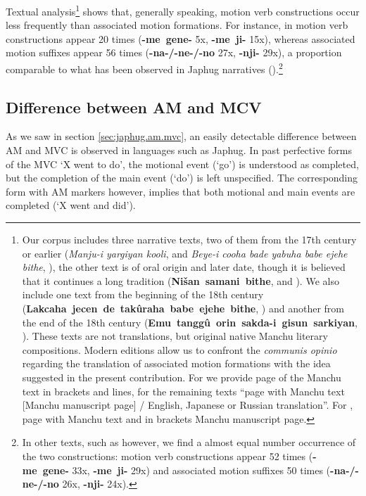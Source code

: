 \documentclass{article}
\newcommand{\ipa}[1]{\textbf{{\phon\mbox{#1}}}} %
\begin{document}
Textual analysis\footnote{Our corpus includes three narrative texts, two of them from the 17th century or earlier (\textit{Manju-i yargiyan kooli}, \citealt{shunjuu92yargiyan} and \textit{Beye-i cooha bade yabuha babe ejehe bithe}, \citealt{cosmo06dzengseo}), the other text is of oral origin and later date, though it is believed that it continues a long tradition (\ipa{Nišan samani bithe}, \citealt{nowak77nisan} and \citealt{jaxontov93nisan}). We also include one text from the beginning of the 18th century (\ipa{Lakcaha jecen de takûraha babe ejehe bithe}, \citealt{shunjuu64tulishen}) and another from the end of the 18th century  (\ipa{Emu tanggû orin sakda-i gisun sarkiyan}, \citealt{stary83sakda}). These texts are not translations, but original native Manchu literary compositions. Modern editions allow us to confront the \textit{communis opinio} regarding the translation of associated motion formations with the idea suggested in the present contribution. For \citet{shunjuu92yargiyan} we provide page of the Manchu text in brackets and lines, for the remaining texts “page with Manchu text [Manchu manuscript page] / English, Japanese or Russian translation”. For \citet{stary83sakda}, page with Manchu text and in brackets Manchu manuscript page.} shows that, generally speaking, motion verb constructions occur less frequently than associated motion formations. For instance, in \citet{cosmo06dzengseo} motion verb constructions appear 20 times (\ipa{-me gene-} 5x, \ipa{-me ji-} 15x), whereas associated motion suffixes appear 56 times (\ipa{-na-/-ne-/-no} 27x, \ipa{-nji-} 29x), a proportion comparable to what has been observed in Japhug narratives (\citealt[209]{jacques13harmonization}).\footnote{In other texts, such as \citealt{jaxontov93nisan} however, we find a almost equal number occurrence of the two constructions:  motion verb constructions appear 52 times (\ipa{-me gene-} 33x, \ipa{-me ji-} 29x) and associated motion suffixes 50 times (\ipa{-na-/-ne-/-no} 26x, \ipa{-nji-} 24x).}

\subsection{Difference between AM and MCV} \label{sec:mvc.manchu}
As we saw in section \ref{sec:japhug.am.mvc}, an easily detectable difference between AM and MVC is observed in languages such as Japhug. In past perfective forms of the MVC ‘X went to do’, the motional event (‘go’) is understood as completed, but the completion of the main event (‘do’) is left unspecified. The corresponding form with AM markers however, implies that both motional and main events are completed (‘X went and did’). 
\end{document}
